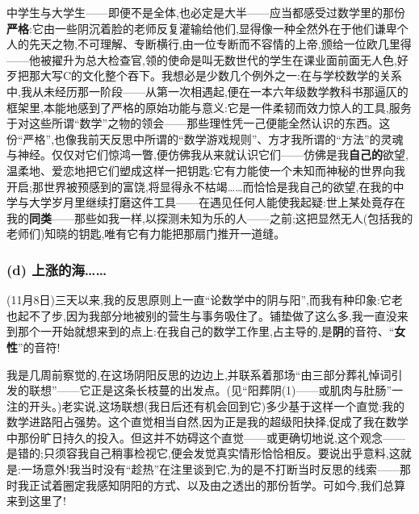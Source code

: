 中学生与大学生——即便不是全体,也必定是大半——应当都感受过数学里的那份\textbf{严格}:它由一些阴沉着脸的老师反复灌输给他们,显得像一种全然外在于他们谦卑个人的先天之物,不可理解、专断横行,由一位专断而\dmark{}不容情的上帝,颁给一位欧几里得——他被擢升为总大检查官,领的使命是叫无数世代的学生在课业面前面无人色,好歹把那大写C的文化整个吞下。我想必是少数几个例外之一:在与学校数学的关系中,我从未经历那一阶段——从第一次相遇起,便在一本六年级数学教科书那逼仄的框架里,本能地感到了严格的原始功能与意义:它是一件柔韧而效力惊人的工具,服务于对这些所谓“数学”之物的领会——那些理性凭一己便能全然认识的东西。这份“严格”,也像我前天反思中所谓的“数学游戏规则”、方才我所谓的“方法”的灵魂与神经。仅仅对它们惊鸿一瞥,便仿佛我从来就认识它们——仿佛是我\textbf{自己的}欲望,温柔地、爱恋地把它们塑成这样一把钥匙:它有力能使一个未知而神秘的世界向我开启;那世界被预感到的富饶,将显得永不枯竭……而恰恰是我自己的欲望,在我的中学与大学岁月里继续打磨这件工具——在遇见任何人能使我起疑:世上某处竟存在我的\textbf{同类}——那些如我一样,以探测未知为乐的人——之前;这把显然无人(包括我的老师们)知晓的钥匙,唯有它有力能把那扇门推开一道缝。

\subsubsection*{(d) 上涨的海……}
\label{ch18:local:h30}

\label{ch18:local:n26}

(11月8日)三天以来,我的反思原则上一直“论数学中的阴与阳”,而我有种印象:它老也起不了步,因为我部分地被别的营生与事务吸住了。铺垫做了这么多,我一直没来到那个一开始就想来到的点上:在我自己的数学工作\dmark{}里,占主导的,是\textbf{阴}的音符、“\textbf{女性}”的音符!

我是几周前察觉的,在这场阴阳反思的边边上,并联系着那场“由三部分葬礼悼词引发的联想”——它正是这条长枝蔓的出发点。(见“阳葬阴(1)——或肌肉与肚肠”一注的开头。)老实说,这场联想(我日后还有机会回到它)多少基于这样一个直觉:我的数学进路阳占强势。这个直觉相当自然,因为正是我的超级阳抉择,促成了我在数学中那份旷日持久的投入。但这并不妨碍这个直觉——或更确切地说,这个观念——是错的;只须容我自己稍事检视它,便会发觉真实情形恰恰相反。要说出乎意料,这就是:一场意外!我当时没有“趁热”在注里谈到它,为的是不打断当时反思的线索——那时我正试着圈定我感知阴阳的方式、以及由之透出的那份哲学。可如今,我们总算来到这里了!

